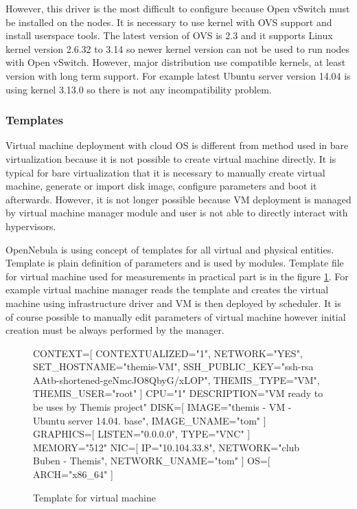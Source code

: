 However, this driver is the most difficult to configure because Open vSwitch must be installed on the nodes. It is necessary to use kernel with \Ac{OVS} support and install userspace tools. The latest version of \Ac{OVS} is 2.3 and it supports Linux kernel version 2.6.32 to 3.14 so newer kernel version can not be used to run nodes with Open vSwitch. However, major distribution use compatible kernels, at least version with long term support. For example latest Ubuntu server version 14.04 is using kernel 3.13.0 so there is not any incompatibility problem.

\subsubsection{Templates}
Virtual machine deployment with cloud \Ac{OS} is different from method used in bare virtualization because it is not possible to create virtual machine directly. It is typical for bare virtualization that it is necessary to manually create virtual machine, generate or import disk image, configure parameters and boot it afterwards. However, it is not longer possible because \Ac{VM} deployment is managed by virtual machine manager module and user is not able to directly interact with hypervisors. 

OpenNebula is using concept of templates for all virtual and physical entities. Template is plain definition of parameters and is used by modules. Template file for virtual machine used for measurements in practical part is in the figure \ref{code:template}. For example virtual machine manager reads the template and creates the virtual machine using infrastructure driver and \Ac{VM} is then deployed by scheduler. It is of course possible to manually edit parameters of virtual machine however initial creation must be always performed by the manager.

\begin{figure}[htb]
\caption{Template for virtual machine}
\label{code:template}
\begin{verbatimtab}
CONTEXT=[
	CONTEXTUALIZED="1",
	NETWORK="YES",
	SET_HOSTNAME="themis-VM",
	SSH_PUBLIC_KEY="ssh-rsa AAtb-shortened-geNmcJO8QbyG/xLOP",
	THEMIS_TYPE="VM",
	THEMIS_USER="root"
	]
CPU="1"
DESCRIPTION="VM ready to be uses by Themis project"
DISK=[
	IMAGE="themis - VM - Ubuntu server 14.04. base",
	IMAGE_UNAME="tom"
	]
GRAPHICS=[
	LISTEN="0.0.0.0",
	TYPE="VNC"
	]
MEMORY="512"
NIC=[
	IP="10.104.33.8",
	NETWORK="club Buben - Themis",
	NETWORK_UNAME="tom"
	]
OS=[
	ARCH="x86_64"
	]
\end{verbatimtab}
\end{figure}

